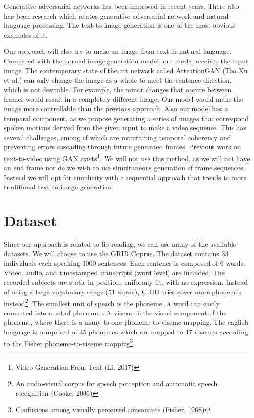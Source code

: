 \documentclass[10pt,twocolumn,letterpaper]{article}
\begin{document}
 Generative adversarial networks has been improved in recent years. There also has been research which relates generative adversarial network and natural language processing. The text-to-image generation is one of the most obvious examples of it. 
  
 Our approach will also try to make an image from text in natural language. Compared with the normal image generation model, our model receives the input image. The contemporary state of the art network called AttentionGAN (Tao Xu et al.) can only change the image as a whole to meet the sentence direction, which is not desirable. For example, the minor changes that occure between frames would result in a completely different image. Our model would make the image more controllable than the previous approach. Also our model has a temporal component, as we propose generating a series of images that correspond spoken motions derived from the given input to make a video sequence. This has several challenges, among of which are maintaining temporal coherency and preventing errors cascading through future generated frames. Previous work on text-to-video using GAN exists\footnote{Video Generation From Text (Li, 2017)}. We will not use this method, as we will not have an end frame nor do we wish to use simultaneous generation of frame sequences. Instead we will opt for simplicity with a sequential approach that trends to more traditional text-to-image generation. 


\section{Dataset}
Since our approach is related to lip-reading, we can use many of the available datasets. We will choose to use the GRID Coprus. The dataset contains 33 individuals each speaking 1000 sentences. Each sentence is composed of 6 words. Video, audio, and timestamped transcripts (word level) are included. The recorded subjects are static in position, uniformly lit, with no expression. Instead of using a large vocabulary range (51 words), GRID tries cover more phonemes instead\footnote{An audio-visual corpus for speech perception and automatic speech recognition (Cooke, 2006)}. The smallest unit of speach is the phoneme. A word can easily converted into a set of phonemes. A viseme is the visual component  of the phoneme, where there is a many to one phoneme-to-viseme mapping. The english language is comprised of 45 phonemes which are mapped to 17 visemes according to the Fisher phoneme-to-viseme mapping\footnote{Confusions among visually perceived consonants (Fisher, 1968)}.
\end{document}
